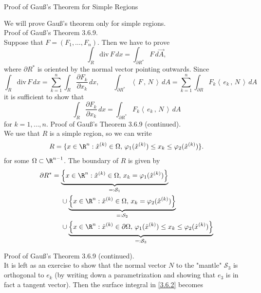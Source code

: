 \documentclass[smaller,hyperref={CJKbookmarks=true}]{beamer}
\newcommand{\scp}[2]{\left\langle\,#1\,,\,#2\,\right\rangle} \newcommand{\scpp}{\langle\,\cdot\,,\,\cdot\,\rangle}
\begin{document}
\begin{frame}{Proof of Gau\ss's Theorem for Simple Regions}
\begin{spacing}{0.9}
We will prove Gau\ss's theorem only for simple regions.\\[3pt]
\alert{Proof of Gau\ss's Theorem 3.6.9.}\\
Suppose that $F=(F_1,\ldots,F_n)$. Then we have to prove
\[\int_R\text{div}\,F\,dx=\int_{\partial R^*}F\,d\vec{A},\]
where $\partial R^*$ is oriented by the normal vector pointing outwards. Since
\[\int_R\text{div}\,F\,dx=\sum_{k=1}^{n}\int_R\frac{\partial F_k}{\partial x_k}\,dx,\qquad\int_{\partial R^*}\scp{F}{N}\,dA=\sum_{k=1}^{n}\int_{\partial R}F_k\scp{e_k}{N}\,dA\]
it is suf{}ficient to show that
\begin{equation}\label{3.6.2}
  \int_R\frac{\partial F_k}{\partial x_k}\,dx=\int_{\partial R^*}F_k\scp{e_k}{N}\,dA
\end{equation}
for $k=1,\ldots,n$.
\newpage
\alert{Proof of Gau\ss's Theorem 3.6.9 (continued).}\\
We use that $R$ is a simple region, so we can write
\[R=\{x\in\R^n:\hat{x}^{(k)}\in\Omega,\,
\varphi_1(\hat{x}^{(k)})\leq x_k\leq\varphi_2(\hat{x}^{(k)})\}.\]
for some $\Omega\subset\R^{n-1}$. The boundary of $R$ is given by
\begin{equation*}
  \begin{split}
     \partial R^* &=\underbrace{\left\{x\in\R^n:\hat{x}^{(k)}\in\Omega,\,
     x_k=\varphi_1(\hat{x}^{(k)})\right\}}_{=:\mathcal{S}_1} \\
       &~~~~\cup\underbrace{\left\{x\in\R^n:\hat{x}^{(k)}\in\Omega,\,
       x_k=\varphi_2(\hat{x}^{(k)})\right\}}_{=:\mathcal{S}_2} \\
       &~~~~\cup\underbrace{\left\{x\in\R^n:\hat{x}^{(k)}\in\partial\Omega,
       \,\varphi_1(\hat{x}^{(k)})\leq x_k\leq\varphi_2(\hat{x}^{(k)})\right\}}_{=:\mathcal{S}_3}
  \end{split}
\end{equation*}
\end{spacing}
\newpage
\begin{spacing}{1.1}
\vspace*{11pt}
\alert{Proof of Gau\ss's Theorem 3.6.9 (continued).}\\[3pt]
It is left as an exercise to show that the normal vector $N$ to the "mantle" $\mathcal{S}_3$ is orthogonal to $e_k$ (by writing down a parametrization and showing that $e_3$ is in fact a tangent vector). Then the surface integral in \eqref{3.6.2} becomes

\end{spacing}
\end{frame}
\end{document}
